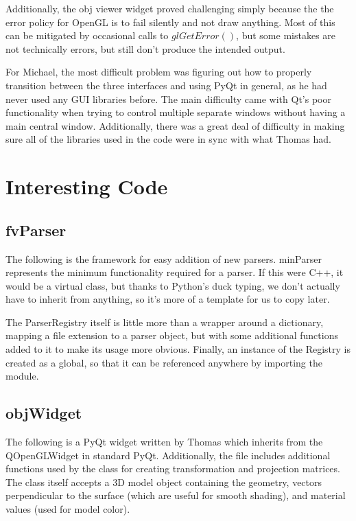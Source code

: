 \documentclass[letterpaper,10pt, onecolumn, draftclsnofoot]{IEEEtran}
\begin{document}
Additionally, the obj viewer widget proved challenging simply because the the error policy for OpenGL is to fail silently and not draw anything. Most of this can be mitigated by occasional calls to $glGetError()$, but some mistakes are not technically errors, but still don't produce the intended output.

For Michael, the most difficult problem was figuring out how to properly transition between the three interfaces and using PyQt in general, as he had never used any GUI libraries before. The main difficulty came with Qt's poor functionality when trying to control multiple separate windows without having a main central window. Additionally, there was a great deal of difficulty in making sure all of the libraries used in the code were in sync with what Thomas had.

\section{Interesting Code} \label{interestingCode}

\subsection{fvParser} 

The following is the framework for easy addition of new parsers. minParser represents the minimum functionality required for a parser. If this were C++, it would be a virtual class, but thanks to Python's duck typing, we don't actually have to inherit from anything, so it's more of a template for us to copy later.

The ParserRegistry itself is little more than a wrapper around a dictionary, mapping a file extension to a parser object, but with some additional functions added to it to make its usage more obvious. Finally, an instance of the Registry is created as a global, so that it can be referenced anywhere by importing the module.



\subsection{objWidget} 

The following is a PyQt widget written by Thomas which inherits from the QOpenGLWidget in standard PyQt. Additionally, the file includes additional functions used by the class for creating transformation and projection matrices. The class itself accepts a 3D model object containing the geometry, vectors perpendicular to the surface (which are useful for smooth shading), and material values (used for model color). 
\end{document}
